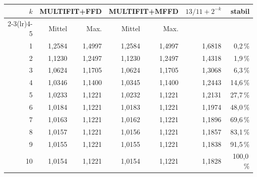 \begin{tabular}{r r r r r r r}
\toprule
$k$ & \multicolumn{2}{c}{MULTIFIT+FFD} & \multicolumn{2}{c}{MULTIFIT+MFFD} & $13/11 + 2^{-k}$ & stabil \\
\cmidrule(lr){2-3}\cmidrule(lr){4-5}
 & Mittel & Max. & Mittel & Max. & & \\
\midrule
1 & 1{,}2584 & 1{,}4997 & 1{,}2584 & 1{,}4997 & 1{,}6818 & 0{,}2\,\% \\
2 & 1{,}1230 & 1{,}2497 & 1{,}1230 & 1{,}2497 & 1{,}4318 & 1{,}9\,\% \\
3 & 1{,}0624 & 1{,}1705 & 1{,}0624 & 1{,}1705 & 1{,}3068 & 6{,}3\,\% \\
4 & 1{,}0346 & 1{,}1400 & 1{,}0345 & 1{,}1400 & 1{,}2443 & 14{,}6\,\% \\
5 & 1{,}0233 & 1{,}1221 & 1{,}0232 & 1{,}1221 & 1{,}2131 & 27{,}7\,\% \\
6 & 1{,}0184 & 1{,}1221 & 1{,}0183 & 1{,}1221 & 1{,}1974 & 48{,}0\,\% \\
7 & 1{,}0163 & 1{,}1221 & 1{,}0162 & 1{,}1221 & 1{,}1896 & 69{,}6\,\% \\
8 & 1{,}0157 & 1{,}1221 & 1{,}0156 & 1{,}1221 & 1{,}1857 & 83{,}1\,\% \\
9 & 1{,}0155 & 1{,}1221 & 1{,}0155 & 1{,}1221 & 1{,}1838 & 91{,}5\,\% \\
10 & 1{,}0154 & 1{,}1221 & 1{,}0154 & 1{,}1221 & 1{,}1828 & 100{,}0\,\% \\
\bottomrule
\end{tabular}
